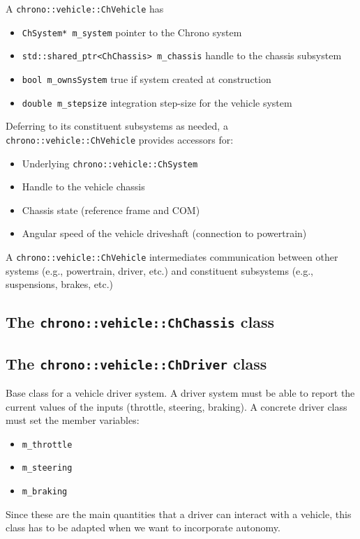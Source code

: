 A \lstinline{chrono::vehicle::ChVehicle} has

\begin{itemize}
\item \lstinline{ChSystem* m_system} pointer to the Chrono system
\item \lstinline{std::shared_ptr<ChChassis> m_chassis} handle to the chassis subsystem
\item \lstinline{bool m_ownsSystem} true if system created at construction
\item \lstinline{double m_stepsize}  integration step-size for the vehicle system
\end{itemize}

Deferring to its constituent subsystems as needed, a \lstinline{chrono::vehicle::ChVehicle} provides accessors for:

\begin{itemize}
\item Underlying \lstinline{chrono::vehicle::ChSystem}
\item Handle to the vehicle chassis
\item Chassis state (reference frame and COM)
\item Angular speed of the vehicle driveshaft (connection to powertrain)
\end{itemize}

A \lstinline{chrono::vehicle::ChVehicle} intermediates communication between other systems (e.g.,
powertrain, driver, etc.) and constituent subsystems (e.g., suspensions, brakes,
etc.)

\subsection{ The \lstinline{chrono::vehicle::ChChassis} class}

\subsection{ The \lstinline{chrono::vehicle::ChDriver} class}

Base class for a vehicle driver system.
A driver system must be able to report the current values of the inputs (throttle, steering, braking). 
A concrete driver class must set the member variables:

\begin{itemize}
\item \lstinline{m_throttle}
\item \lstinline{m_steering} 
\item \lstinline{m_braking}
\end{itemize}
Since these are the main quantities that a driver can interact with a vehicle, this class has to be adapted
when we want to incorporate autonomy. 


